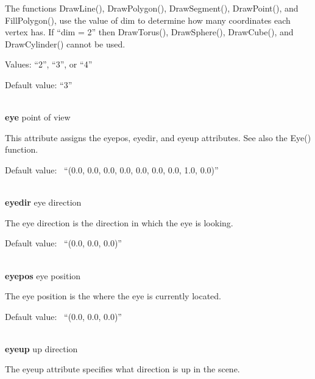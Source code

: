 \documentclass[letterpaper]{article}
\begin{document}
\bigskip

{
The functions \textsf{DrawLine(), DrawPolygon(), DrawSegment(), DrawPoint(),} and \textsf{FillPolygon(), }use the value
of \textsf{dim} to determine how many coordinates each vertex has. If \textsf{{}``dim = 2''} then \textsf{DrawTorus(),
DrawSphere(), DrawCube(),} and \textsf{DrawCylinder()} cannot be used. }


\bigskip

{
Values: \textsf{{}``2''}, \textsf{{}``3''}, or \textsf{{}``4''}}

{
Default value: \textsf{{}``3''}}

\noindent\hrulefill\\
\noindent\textsf{\textbf{eye}} \hfill point of view


\bigskip

{
This attribute assigns the eyepos, eyedir, and eyeup attributes. See also the \textsf{Eye()} function.}


\bigskip

{
Default value: \ \textsf{{}``(0.0, 0.0, 0.0, 0.0, 0.0, 0.0, 0.0, 1.0, 0.0)''}}

\noindent\hrulefill\\
\noindent\textsf{\textbf{eyedir}} \hfill eye direction


\bigskip

{
The eye direction is the direction in which the eye is looking.}


\bigskip

{
Default value: \ \textsf{{}``(0.0, 0.0, 0.0)''}}

\noindent\hrulefill\\
\noindent\textsf{\textbf{eyepos}} \hfill eye position


\bigskip

{
The eye position is the where the eye is currently located. }


\bigskip

{
Default value: \ \textsf{{}``(0.0, 0.0, 0.0)''}}

\noindent\hrulefill\\
\noindent\textsf{\textbf{eyeup}} \hfill up direction


\bigskip

{
The eyeup attribute specifies what direction is up in the scene. }
\end{document}
